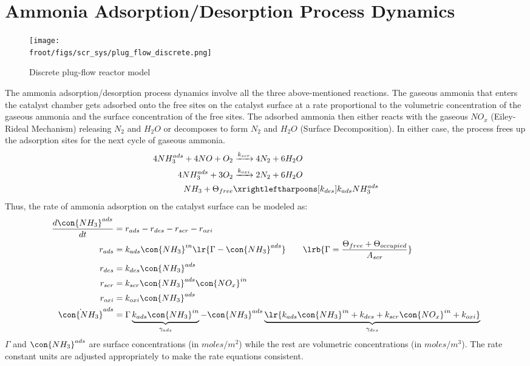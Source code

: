 \newpage
\section{Ammonia Adsorption/Desorption Process Dynamics \label{sec::sigma_deriv}}
\begin{figure}[H]
    \centering
    \texttt{[image: \\froot/figs/scr\_sys/plug\_flow\_discrete.png]}
    \caption{Discrete plug-flow reactor model}
    \label{fig:plug_flow_discrete}
\end{figure}
The ammonia adsorption/desorption process dynamics involve all the three above-mentioned reactions. The gaseous ammonia
that enters the catalyst chamber gets adsorbed onto the free sites on the catalyst surface at a rate proportional to the
volumetric concentration of the gaseous ammonia and the surface concentration of the free sites. The adsorbed ammonia
then either reacts with the gaseous $NO_x$ (Eiley-Rideal Mechanism) releasing $N_2$ and $H_2O$ or decomposes to form
$N_2$ and $H_2O$ (Surface Decomposition). In either case, the process frees up the adsorption sites for the next cycle
of gaseous ammonia.
\begin{align*}
    4 NH_3 ^{ads} + 4 NO + O_2 &\xrightarrow[]{k_{scr}} 4 N_2 + 6 H_2O \\
    4 NH_3^{ads} + 3 O_2 &\xrightarrow[]{k_{oxi}} 2 N_2 + 6 H_2O \\
    NH_3 + \Theta_{free} &\xrightleftharpoons[k_{des}]{k_{ads}} NH_3^{ads}
\end{align*}
Thus, the rate of ammonia adsorption on the catalyst surface can be modeled as:
\begin{align*}
    \frac{d \con{NH_3}^{ads}}{dt} &= r_{ads} - r_{des} - r_{scr} - r_{oxi}\\
    r_{ads} &= k_{ads} \con{NH_3}^{in} \lr{\Gamma - \con{NH_3}^{ads}} \qquad \lrb{\Gamma = \frac{\Theta_{free} + \Theta_{occupied}}{A_{scr}}}\\
    r_{des} &= k_{des} \con{NH_3}^{ads}\\
    r_{scr} &= k_{scr} \con{NH_3}^{ads} \con{NO_x}^{in}\\
    r_{oxi} &= k_{oxi} \con{NH_3}^{ads}\\
    \dot{\con{NH_3}}^{ads} &= \Gamma \underbrace{k_{ads} \con{NH_3}^{in}}_{\gamma_{ads}} - \con{NH_3}^{ads} \underbrace{\lr{k_{ads} \con{NH_3}^{in} + k_{des} + k_{scr} \con{NO_x}^{in} + k_{oxi}}}_{\gamma_{des}}
\end{align*}
 $\Gamma$ and $\con{NH_3}^{ads}$ are surface concentrations (in $moles/m^2$) while the rest are volumetric
concentrations (in $moles/m^3$). The rate constant units are adjusted appropriately to make the rate equations
consistent.

